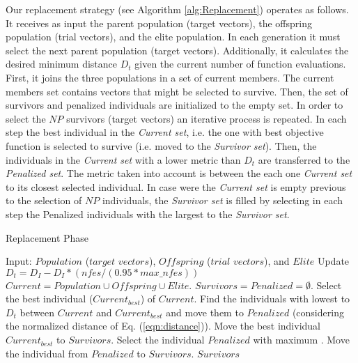 Our replacement strategy (see Algorithm \ref{alg:Replacement}) operates as follows.
%
It receives as input the parent population (target vectors), the offspring population (trial vectors), and the elite population.
%
In each generation it must select the next parent population (target vectors).
%
Additionally, it calculates the desired minimum distance $D_t$ given the current number of function evaluations.
%
First, it joins the three populations in a set of current members.
%
The current members set contains vectors that might be selected to survive.
%
Then, the set of survivors and penalized individuals are initialized to the empty set.
%
In order to select the $NP$ survivors (target vectors) an iterative process is repeated.
%
In each step the best individual in the \textit{Current set}, i.e. the one with best objective function is selected
to survive (i.e. moved to the \textit{Survivor set}).
%
Then, the individuals in the \textit{Current set} with a lower metric \DCN{} than $D_t$ are transferred to the \textit{Penalized set}.
%
The \DCN{} metric taken into account is between the each one \textit{Current set} to its closest selected individual.
%
In case were the \textit{Current set} is empty previous to the selection of $NP$ individuals, the \textit{Survivor set} is filled by selecting in each step the Penalized individuals with the largest \DCN{} to the \textit{Survivor set}.


\begin{algorithm}[H]
  \scriptsize
	\caption{Replacement Phase} \label{alg:Replacement}
	\begin{algorithmic}[1]
	\STATE Input: $Population$ ($target$ $vectors$), $Offspring$ ($trial$ $vectors$), and $Elite$
	\STATE Update $D_t = D_I - D_I *(nfes/(0.95*max\_nfes)) $ 
	\STATE $Current = Population \cup Offspring \cup Elite$.
	\STATE $Survivors = Penalized = \emptyset$.
	   \STATE Select the best individual ($Current_{best}$) of $Current$.
	   \STATE Find the individuals with lowest \DCN{} to $D_t$ between $Current$ and $Current_{best}$ and move them to $Penalized$ (considering the normalized distance of Eq. (\ref{eqn:distance})).
	   \STATE Move the best individual $Current_{best}$ to $Survivors$.
	\ENDWHILE
	   \STATE Select the individual $Penalized$ with maximum \DCN{}.
	   \STATE Move the individual from $Penalized$ to $Survivors$.
	\ENDWHILE
       \RETURN $Survivors$
\end{algorithmic}
\end{algorithm}


